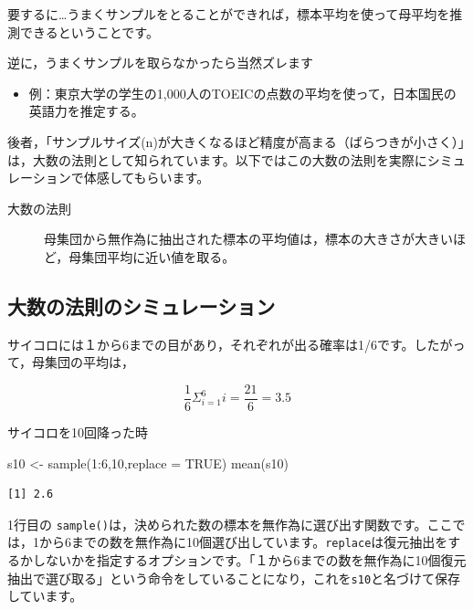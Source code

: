 \documentclass[
  letterpaper,
  DIV=11,
  numbers=noendperiod]{scrreprt}
\newenvironment{Shaded}{\begin{snugshade}}{\end{snugshade}}
\newcommand{\AttributeTok}[1]{\textcolor[rgb]{0.40,0.45,0.13}{#1}}
\newcommand{\ConstantTok}[1]{\textcolor[rgb]{0.56,0.35,0.01}{#1}}
\newcommand{\DecValTok}[1]{\textcolor[rgb]{0.68,0.00,0.00}{#1}}
\newcommand{\FunctionTok}[1]{\textcolor[rgb]{0.28,0.35,0.67}{#1}}
\newcommand{\NormalTok}[1]{\textcolor[rgb]{0.00,0.23,0.31}{#1}}
\newcommand{\OtherTok}[1]{\textcolor[rgb]{0.00,0.23,0.31}{#1}}
\newcommand{\SpecialCharTok}[1]{\textcolor[rgb]{0.37,0.37,0.37}{#1}}
\providecommand{\tightlist}{%
  \setlength{\itemsep}{0pt}\setlength{\parskip}{0pt}}\usepackage{longtable,booktabs,array}
\begin{document}
要するに\ldots うまくサンプルをとることができれば，標本平均を使って母平均を推測できるということです。

逆に，うまくサンプルを取らなかったら当然ズレます

\begin{itemize}
\tightlist
\item
  例：東京大学の学生の1,000人のTOEICの点数の平均を使って，日本国民の英語力を推定する。
\end{itemize}

後者，「サンプルサイズ(n)が大きくなるほど精度が高まる（ばらつきが小さく）」は，大数の法則として知られています。以下ではこの大数の法則を実際にシミュレーションで体感してもらいます。

\begin{description}
\item[大数の法則]
母集団から無作為に抽出された標本の平均値は，標本の大きさが大きいほど，母集団平均に近い値を取る。
\end{description}

\hypertarget{ux5927ux6570ux306eux6cd5ux5247ux306eux30b7ux30dfux30e5ux30ecux30fcux30b7ux30e7ux30f3}{%
\subsection{大数の法則のシミュレーション}\label{ux5927ux6570ux306eux6cd5ux5247ux306eux30b7ux30dfux30e5ux30ecux30fcux30b7ux30e7ux30f3}}

サイコロには１から6までの目があり，それぞれが出る確率は1/6です。したがって，母集団の平均は，

\[
\frac{1}{6}\Sigma^6_{i=1}i=\frac{21}{6}=3.5
\]

サイコロを10回降った時

\begin{Shaded}
\begin{Highlighting}[]
\NormalTok{s10 }\OtherTok{\textless{}{-}} \FunctionTok{sample}\NormalTok{(}\DecValTok{1}\SpecialCharTok{:}\DecValTok{6}\NormalTok{,}\DecValTok{10}\NormalTok{,}\AttributeTok{replace =} \ConstantTok{TRUE}\NormalTok{)}
\FunctionTok{mean}\NormalTok{(s10)}
\end{Highlighting}
\end{Shaded}

\begin{verbatim}
[1] 2.6
\end{verbatim}

1行目の
\texttt{sample()}は，決められた数の標本を無作為に選び出す関数です。ここでは，1から6までの数を無作為に10個選び出しています。\texttt{replace}は復元抽出をするかしないかを指定するオプションです。「１から6までの数を無作為に10個復元抽出で選び取る」という命令をしていることになり，これを\texttt{s10}と名づけて保存しています。
\end{document}
